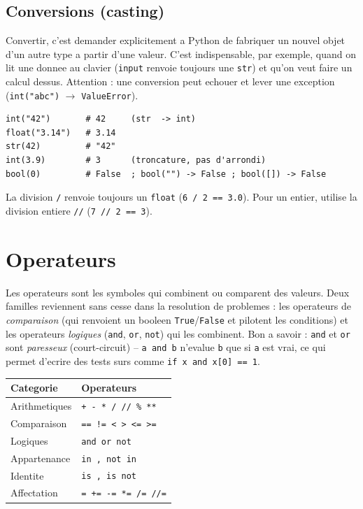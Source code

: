 \documentclass[11pt,a4paper]{article}
\begin{document}
\subsection{Conversions (casting)}
Convertir, c'est demander explicitement a Python de fabriquer un nouvel objet
d'un autre type a partir d'une valeur. C'est indispensable, par exemple, quand on
lit une donnee au clavier (\texttt{input} renvoie toujours une \texttt{str}) et
qu'on veut faire un calcul dessus. Attention : une conversion peut echouer et
lever une exception (\texttt{int("abc")} $\rightarrow$ \texttt{ValueError}).

\begin{lstlisting}
int("42")       # 42     (str  -> int)
float("3.14")   # 3.14
str(42)         # "42"
int(3.9)        # 3      (troncature, pas d'arrondi)
bool(0)         # False  ; bool("") -> False ; bool([]) -> False
\end{lstlisting}

\begin{piege}
La division \texttt{/} renvoie toujours un \texttt{float} (\texttt{6 / 2 == 3.0}).
Pour un entier, utilise la division entiere \texttt{//} (\texttt{7 // 2 == 3}).
\end{piege}

\section{Operateurs}
Les operateurs sont les symboles qui combinent ou comparent des valeurs. Deux
familles reviennent sans cesse dans la resolution de problemes : les operateurs
de \emph{comparaison} (qui renvoient un booleen \texttt{True}/\texttt{False} et
pilotent les conditions) et les operateurs \emph{logiques} (\texttt{and},
\texttt{or}, \texttt{not}) qui les combinent. Bon a savoir : \texttt{and} et
\texttt{or} sont \emph{paresseux} (court-circuit) -- \texttt{a and b} n'evalue
\texttt{b} que si \texttt{a} est vrai, ce qui permet d'ecrire des tests surs
comme \texttt{if x and x[0] == 1}.

\begin{longtable}{>{\raggedright\arraybackslash}p{4cm} p{9cm}}
\rowcolor{primary}
\textbf{\color{white}Categorie} & \textbf{\color{white}Operateurs} \\
\hline
Arithmetiques   & \texttt{+  -  *  /  //  \%  **} \\
Comparaison     & \texttt{==  !=  <  >  <=  >=} \\
Logiques        & \texttt{and  or  not} \\
Appartenance    & \texttt{in  ,  not in} \\
Identite        & \texttt{is  ,  is not} \\
Affectation     & \texttt{=  +=  -=  *=  /=  //=} \\
\end{longtable}
\end{document}
